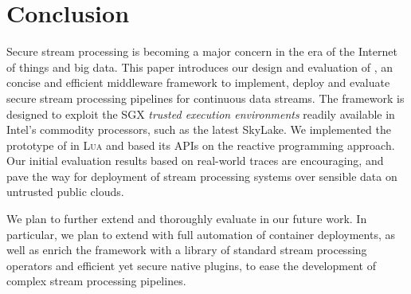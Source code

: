 \section{Conclusion}
\label{sec:conclusion}

Secure stream processing is becoming a major concern in the era of the Internet of things and big data.
This paper introduces our design and evaluation of \SYS{}, an concise and efficient middleware framework to implement, deploy and evaluate secure stream processing pipelines for continuous data streams.
The framework is designed to exploit the SGX \emph{trusted execution environments} readily available in Intel's commodity processors, such as the latest SkyLake.
We implemented the prototype of \SYS{} in \textsc{Lua} and based its APIs on the reactive programming approach.
Our initial evaluation results based on real-world traces are encouraging, and pave the way for deployment of stream processing systems over sensible data on untrusted public clouds.

We plan to further extend and thoroughly evaluate \SYS in our future work.
In particular, we plan to extend \SYS with full automation of container deployments, as well as enrich the framework with a library of standard stream processing operators and efficient yet secure native plugins, to ease the development of complex stream processing pipelines.
\newpage